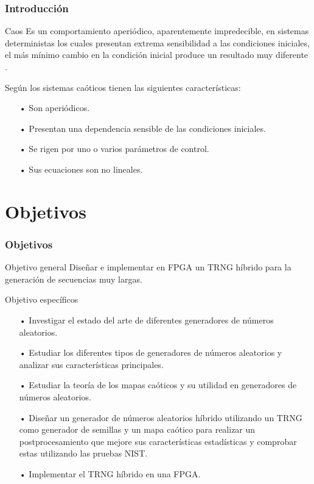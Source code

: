 \documentclass[10pt]{beamer}
\begin{document}
\begin{frame}
    \frametitle{Introducción}
    \begin{block}{Caos}
        \justifying
        Es un comportamiento aperiódico, aparentemente impredecible, en sistemas deterministas los cuales presentan extrema sensibilidad a las condiciones iniciales, el más mínimo cambio en la condición inicial produce un resultado muy diferente \cite{Strogatz1994}.
        \vspace{0.5cm}
        
        Según \cite{Sprott2003} los sistemas caóticos tienen las siguientes características:

        \begin{itemize}
            \item[•] Son aperiódicos. %
            \item[•] Presentan una dependencia sensible de las condiciones iniciales. %
            \item[•] Se rigen por uno o varios parámetros de control. %
            \item[•] Sus ecuaciones son no lineales.
        \end{itemize}
	\end{block}
\end{frame}


\section{Objetivos}
\begin{frame}
    \frametitle{Objetivos}
    \begin{block}{Objetivo general}
        \justifying
        Diseñar e implementar en FPGA un TRNG híbrido para la generación de secuencias muy largas.
	\end{block}

    \begin{block}{Objetivo específicos}
        \justifying
        \begin{itemize}
            \item[•] Investigar el estado del arte de diferentes generadores de números aleatorios.
            \item[•] Estudiar los diferentes tipos de generadores de números aleatorios y analizar sus características principales.
            \item[•] Estudiar la teoría de los mapas caóticos y su utilidad en generadores de números aleatorios.
            \item[•] Diseñar un generador de números aleatorios híbrido utilizando un TRNG como generador de semillas y un mapa caótico para realizar un postprocesamiento que mejore sus características estadísticas y comprobar estas utilizando las pruebas NIST.
            \item[•] Implementar el TRNG híbrido en una FPGA.
        \end{itemize}
	\end{block}

\end{frame}
\end{document}
